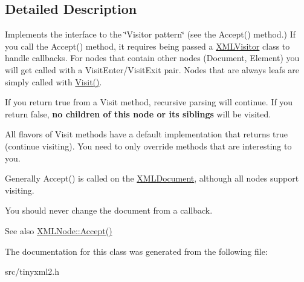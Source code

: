 \subsection{Detailed Description}
Implements the interface to the \char`\"{}\+Visitor pattern\char`\"{} (see the Accept() method.) If you call the Accept() method, it requires being passed a \hyperlink{classCPlantBox_1_1tinyxml2_1_1XMLVisitor}{X\+M\+L\+Visitor} class to handle callbacks. For nodes that contain other nodes (Document, Element) you will get called with a Visit\+Enter/\+Visit\+Exit pair. Nodes that are always leafs are simply called with \hyperlink{classCPlantBox_1_1tinyxml2_1_1XMLVisitor_aee273d054d532dc63e0b5fe7c91c2124}{Visit()}.

If you return \textquotesingle{}true\textquotesingle{} from a Visit method, recursive parsing will continue. If you return false, {\bfseries no children of this node or its siblings} will be visited.

All flavors of Visit methods have a default implementation that returns \textquotesingle{}true\textquotesingle{} (continue visiting). You need to only override methods that are interesting to you.

Generally Accept() is called on the \hyperlink{classCPlantBox_1_1tinyxml2_1_1XMLDocument}{X\+M\+L\+Document}, although all nodes support visiting.

You should never change the document from a callback.

\begin{DoxySeeAlso}{See also}
\hyperlink{classCPlantBox_1_1tinyxml2_1_1XMLNode_a2cdc6f044bd1f971e211328e42a4f9d5}{X\+M\+L\+Node\+::\+Accept()} 
\end{DoxySeeAlso}


The documentation for this class was generated from the following file\+:\begin{DoxyCompactItemize}
\item 
src/tinyxml2.\+h\end{DoxyCompactItemize}
